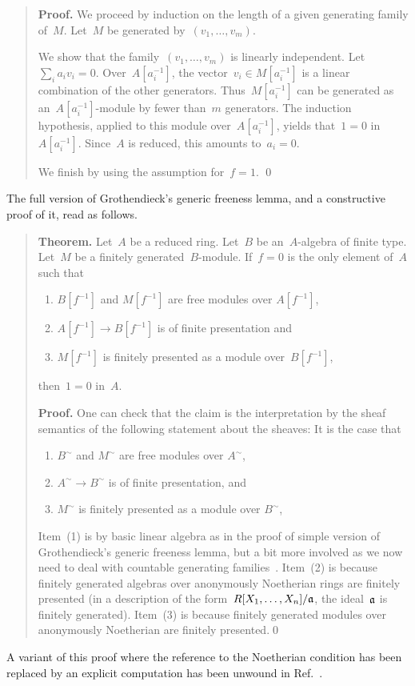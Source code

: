\documentclass{ws-rv9x6}
\begin{document}
{\begin{quote}\textbf{Proof.}
We proceed by induction on the length of a given generating family
of~$M$. Let~$M$ be generated by~$(v_1,\ldots,v_m)$.

We show that the family~$(v_1,\ldots,v_m)$ is linearly independent. Let~$\sum_i
a_i v_i = 0$. Over~$A[a_i^{-1}]$, the vector~$v_i \in M[a_i^{-1}]$ is a linear
combination of the other generators. Thus~$M[a_i^{-1}]$ can be generated as
an~$A[a_i^{-1}]$-module by fewer than~$m$ generators. The induction hypothesis,
applied to this module over~$A[a_i^{-1}]$, yields that~$1 = 0$ in~$A[a_i^{-1}]$. Since~$A$ is
reduced, this amounts to~$a_i = 0$.

We finish by using the assumption for~$f = 1$. \qed
\end{quote}
The full version of Grothendieck's generic freeness lemma, and a constructive
proof of it, read as follows.\par
\begin{quote}
\textbf{Theorem.}
Let~$A$ be a reduced ring. Let~$B$ be an~$A$-algebra of finite type. Let~$M$ be
a finitely generated~$B$-module.
If~$f = 0$ is the only element of~$A$ such that
\begin{enumerate}
\item $B[f^{-1}]$ and $M[f^{-1}]$ are free modules over $A[f^{-1}]$,
\item $A[f^{-1}] \to B[f^{-1}]$ is of finite presentation and
\item $M[f^{-1}]$ is finitely presented as a module over~$B[f^{-1}]$,
\end{enumerate}
then~$1 = 0$ in~$A$.

\textbf{Proof.} One can check that the claim is the interpretation by the sheaf
semantics of the following statement about the sheaves: It is \notnot the case that
\begin{enumerate}
  \item $B^\sim$ and $M^\sim$ are free modules over $A^\sim$,
  \item $A^\sim \to B^\sim$ is of finite presentation, and
  \item $M^\sim$ is finitely presented as a module over $B^\sim$,
\end{enumerate}

Item~(1) is by basic linear algebra as in the proof of
simple version of Grothendieck's generic freeness lemma, but a bit more involved as we now need to
deal with countable generating
families~\cite[Theorem~11.16]{blechschmidt:phd}. Item~(2) is because finitely
generated algebras over anonymously Noetherian rings are \notnot finitely
presented (in a description of the form~$R[X_1,\ldots,X_n]/\mathfrak{a}$, the
ideal~$\mathfrak{a}$ is \notnot finitely generated).
Item~(3) is because finitely generated modules over anonymously Noetherian are
\notnot finitely presented.\qed
\end{quote}
A variant of this proof where the reference to the Noetherian condition has
been replaced by an explicit computation has been unwound in
Ref.~.


}
\end{document}
